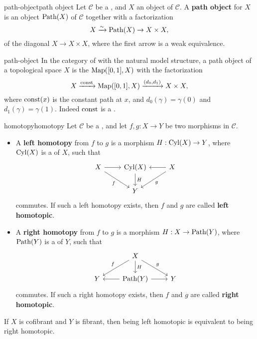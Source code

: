 \begin{topic}{path-object}{path object}
    Let $\mathcal{C}$ be a , and $X$ an object of $\mathcal{C}$. A \textbf{path object} for $X$ is an object $\textup{Path}(X)$ of $\mathcal{C}$ together with a factorization
    \[ X \xrightarrow{\sim} \textup{Path}(X) \to X \times X , \]
    of the diagonal $X \to X \times X$, where the first arrow is a weak equivalence.
\end{topic}

\begin{example}{path-object}
    In the category of  with the natural model structure, a path object of a topological space $X$ is the  $\textup{Map}([0, 1], X)$ with the factorization
    \[ X \xrightarrow{\textup{const}} \textup{Map}([0, 1], X) \xrightarrow{(d_0, d_1)} X \times X , \]
    where $\textup{const}(x)$ is the constant path at $x$, and $d_0(\gamma) = \gamma(0)$ and $d_1(\gamma) = \gamma(1)$. Indeed $\textup{const}$ is a .
\end{example}

\begin{topic}{homotopy}{homotopy}
    Let $\mathcal{C}$ be a , and let $f, g : X \to Y$ be two morphisms in $\mathcal{C}$.
    \begin{itemize}
        \item A \textbf{left homotopy} from $f$ to $g$ is a morphism $H : \textup{Cyl}(X) \to Y$, where $\textup{Cyl}(X)$ is a  of $X$, such that
        \[ \begin{tikzcd} X \arrow{r} \arrow[swap]{dr}{f} & \textup{Cyl}(X) \arrow{d}{H} & X \arrow{l} \arrow{ld}{g} \\ & Y & \end{tikzcd} \]
        commutes. If such a left homotopy exists, then $f$ and $g$ are called \textbf{left homotopic}.
        \item A \textbf{right homotopy} from $f$ to $g$ is a morphism $H : X \to \textup{Path}(Y)$, where $\textup{Path}(Y)$ is a  of $Y$, such that
        \[ \begin{tikzcd} & X \arrow{d}{H} \arrow[swap]{dl}{f} \arrow{dr}{g} & \\ Y & \textup{Path}(Y) \arrow{l} \arrow{r} & Y \end{tikzcd} \]
        commutes. If such a right homotopy exists, then $f$ and $g$ are called \textbf{right homotopic}.
    \end{itemize}
    If $X$ is cofibrant and $Y$ is fibrant, then being left homotopic is equivalent to being right homotopic.
\end{topic}

